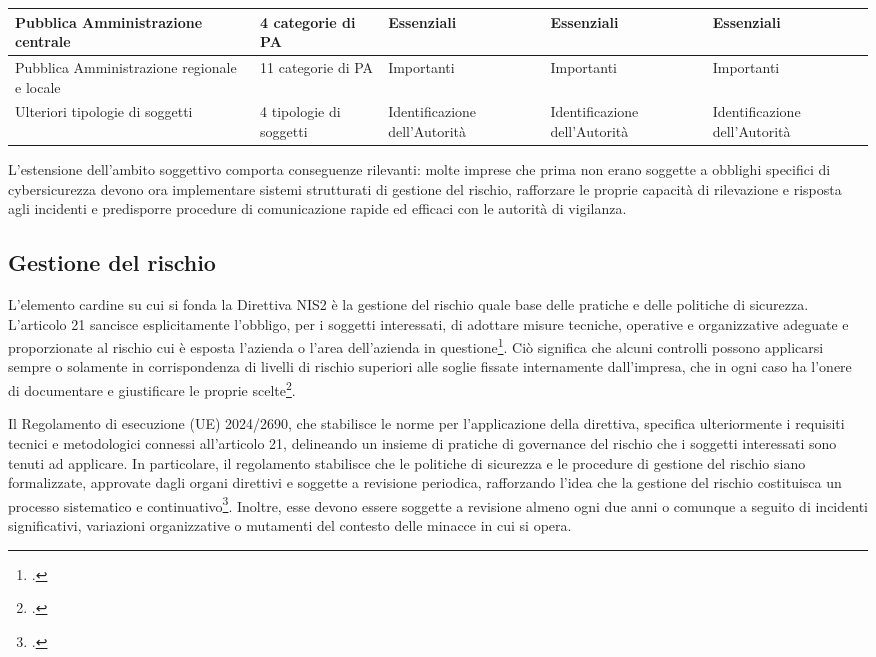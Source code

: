 \begin{table}[!ht]
{{\begin{tabular}{|l|l|l|l|l|}
        Pubblica Amministrazione centrale & 4 categorie di PA & \cellcolor{myRed}\color{white}Essenziali & \cellcolor{myRed}\color{white}Essenziali & \cellcolor{myRed}\color{white}Essenziali \\ \hline
        Pubblica Amministrazione regionale e locale & 11 categorie di PA & \cellcolor{myOrange}\color{white}Importanti & \cellcolor{myOrange}\color{white}Importanti & \cellcolor{myOrange}\color{white}Importanti \\ \hline
        Ulteriori tipologie di soggetti & 4 tipologie di soggetti & \cellcolor{myBlue}\color{white}Identificazione dell’Autorità & \cellcolor{myBlue}\color{white}Identificazione dell’Autorità & \cellcolor{myBlue}\color{white}Identificazione dell’Autorità \\ \hline
    \end{tabular}
    }}
\end{table}

L’estensione dell’ambito soggettivo comporta conseguenze rilevanti: molte imprese che prima non erano soggette 
a obblighi specifici di cybersicurezza devono ora implementare sistemi strutturati di gestione del rischio, 
rafforzare le proprie capacità di rilevazione e risposta agli incidenti e predisporre procedure di comunicazione 
rapide ed efficaci con le autorità di vigilanza. 


\subsection{Gestione del rischio}
L'elemento cardine su cui si fonda la Direttiva NIS2 è la gestione del rischio
quale base delle pratiche e delle politiche di sicurezza. L'articolo 21 sancisce esplicitamente l'obbligo,
per i soggetti interessati, di adottare misure tecniche, operative e organizzative adeguate e proporzionate al rischio
cui è esposta l'azienda o l'area dell'azienda in questione\footcite[art. 21]{nis2-directive}. Ciò 
significa che alcuni controlli possono applicarsi sempre o solamente in corrispondenza di livelli di rischio
superiori alle soglie fissate internamente dall'impresa, che in ogni caso ha l'onere di documentare e
giustificare le proprie scelte\footcite[art. 2]{regolamento-2690}.

Il Regolamento di esecuzione (UE) 2024/2690, che stabilisce le norme per l'applicazione della direttiva,
specifica ulteriormente i requisiti tecnici e metodologici connessi all’articolo 21, delineando un insieme 
di pratiche di governance del rischio che i soggetti interessati sono tenuti ad applicare. In particolare, 
il regolamento stabilisce che le politiche di sicurezza e le procedure di gestione del rischio siano formalizzate, 
approvate dagli organi direttivi e soggette a revisione periodica, rafforzando l’idea che la gestione del rischio 
costituisca un processo sistematico e continuativo\footcite[Allegato]{regolamento-2690}. Inoltre, 
esse devono essere soggette a revisione almeno ogni due anni o comunque a seguito di incidenti 
significativi, variazioni organizzative o mutamenti del contesto delle minacce in cui si opera.


